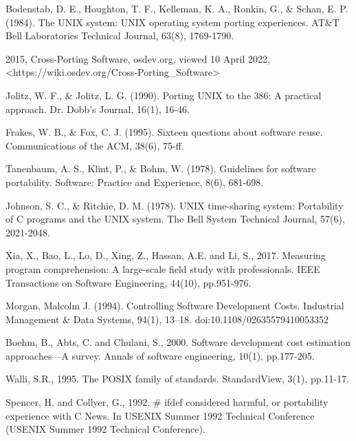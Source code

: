 \begin{flushleft}
\begin{thebibliography}{99}
    Bodenstab, D. E., Houghton, T. F., Kelleman, K. A., Ronkin, G., \& Schan, E. P. (1984).
    The UNIX system: UNIX operating system porting experiences.
    AT\&T Bell Laboratories Technical Journal, 63(8), 1769-1790.

    2015,
    Cross-Porting Software,
    osdev.org,
    viewed 10 April 2022,
    <https://wiki.osdev.org/Cross-Porting\_Software>

    Jolitz, W. F., \& Jolitz, L. G. (1990).
    Porting UNIX to the 386: A practical approach.
    Dr. Dobb's Journal, 16(1), 16-46.

    Frakes, W. B., \& Fox, C. J. (1995).
    Sixteen questions about software reuse.
    Communications of the ACM, 38(6), 75-ff.

    Tanenbaum, A. S., Klint, P., \& Bohm, W. (1978).
    Guidelines for software portability.
    Software: Practice and Experience, 8(6), 681-698.

    Johnson, S. C., \& Ritchie, D. M. (1978).
    UNIX time-sharing system: Portability of C programs and the UNIX system.
    The Bell System Technical Journal, 57(6), 2021-2048.

    Xia, X., Bao, L., Lo, D., Xing, Z., Hassan, A.E. and Li, S., 2017.
    Measuring program comprehension: A large-scale field study with professionals.
    IEEE Transactions on Software Engineering, 44(10), pp.951-976.

    Morgan, Malcolm J. (1994).
    Controlling Software Development Costs.
    Industrial Management \& Data Systems, 94(1), 13–18. doi:10.1108/02635579410053352

    Boehm, B., Abts, C. and Chulani, S., 2000.
    Software development cost estimation approaches—A survey.
    Annals of software engineering, 10(1), pp.177-205.

    Walli, S.R., 1995.
    The POSIX family of standards. StandardView, 3(1), pp.11-17.

    Spencer, H. and Collyer, G., 1992.
    \# ifdef considered harmful, or portability experience with C News.
    In USENIX Summer 1992 Technical Conference (USENIX Summer 1992 Technical Conference).

    \end{thebibliography}
\end{flushleft}
